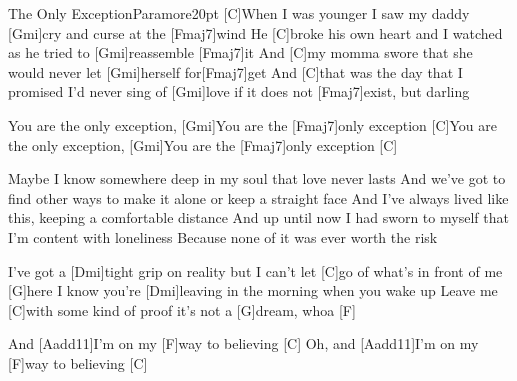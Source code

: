 \begin{song}{The Only Exception}{Paramore}{20pt}
%
[C]When I was younger I saw my daddy [Gmi]cry and curse at the [Fmaj7]wind
He [C]broke his own heart and I watched as he tried to [Gmi]reassemble [Fmaj7]it
And [C]my momma swore that she would never let [Gmi]herself for[Fmaj7]get
And [C]that was the day that I promised I'd never sing of [Gmi]love
if it does not [Fmaj7]exist, but darling

\chorus%
[C]You are the only exception, [Gmi]You are the [Fmaj7]only exception
[C]You are the only exception, [Gmi]You are the [Fmaj7]only exception [C]{}


%
Maybe I know somewhere deep in my soul that love never lasts
And we've got to find other ways to make it alone or keep a straight face
And I've always lived like this, keeping a comfortable distance
And up until now I had sworn to myself that I'm content with loneliness
Because none of it was ever worth the risk
\repchor

\verse{*}%
I've got a [Dmi]tight grip on reality but I can't 
let [C]go of what's in front of me [G]here
I know you're [Dmi]leaving in the morning when you wake up
Leave me [C]with some kind of proof it's not a [G]dream, whoa [F]{}
\repchor\enspace{}

\verse{*}%
And [Aadd11]I'm on my [F]way to believing [C]{}
Oh, and [Aadd11]I'm on my [F]way to believing [C]{}
\end{song}
